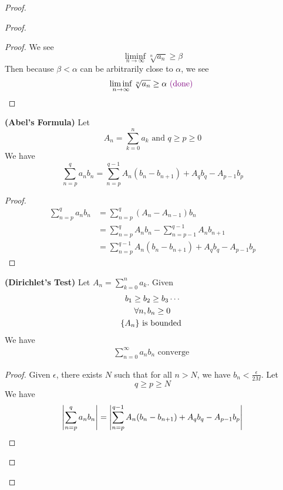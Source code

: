 \documentclass{report}
\begin{document}
\begin{proof}
\begin{proof}
\begin{proof}
We see
\begin{equation}
\liminf_{n\to\infty} \sqrt[n]{a_n} \geq \beta 
\end{equation}
Then because $\beta<\alpha $ can be arbitrarily close to $\alpha $, we see
\begin{equation}
\liminf_{n\to\infty} \sqrt[n]{a_n}  \geq \alpha \textcolor{violet}{\text{ (done) }}
\end{equation}
\end{proof}
\begin{lemma}
\label{2.5.4}
\textbf{(Abel's Formula)} Let
\begin{equation}
A_n=\sum_{k=0}^n a_k\text{ and }q\geq p \geq 0
\end{equation}
We have
\begin{equation}
\sum_{n=p}^q a_nb_n=\sum_{n=p}^{q-1}A_n(b_n-b_{n+1})+A_qb_q-A_{p-1}b_p
\end{equation}
\end{lemma}
\begin{proof}
\begin{align}
  \sum_{n=p}^q a_nb_n&=\sum_{n=p}^q (A_{n}-A_{n-1})b_n\\
  &=\sum_{n=p}^q A_nb_n-\sum_{n=p-1}^{q-1}A_nb_{n+1}\\
  &=\sum_{n=p}^{q-1}A_n(b_n-b_{n+1})+A_qb_q-A_{p-1}b_p
\end{align}
\end{proof}
\begin{theorem}
\label{2.5.5}
\textbf{(Dirichlet's Test)} 
Let $A_n=\sum_{k=0}^n a_k$. Given
\begin{gather}
b_1\geq b_2\geq b_3\cdots\\
\forall n, b_n\geq 0\\
\{ A_n \}\text{ is bounded  }
\end{gather}
We have
\begin{gather}
\sum_{n=0}^\infty a_nb_n\text{ converge }
\end{gather}
\end{theorem}
\begin{proof}
Given $\epsilon $, there exists $N$ such that for all $n>N$, we have  $b_n<\frac{\epsilon }{2M}$. Let 
\begin{equation}
q\geq p\geq N
\end{equation}
We have
\begin{align}
\abso{\sum_{n=p}^q a_nb_n}&=\abso{\sum_{n=p}^{q-1}A_n(b_n-b_{n+1})+A_qb_q-A_{p-1}b_p}\\

\end{align}
\end{proof}
\end{proof}
\end{proof}
\end{document}
